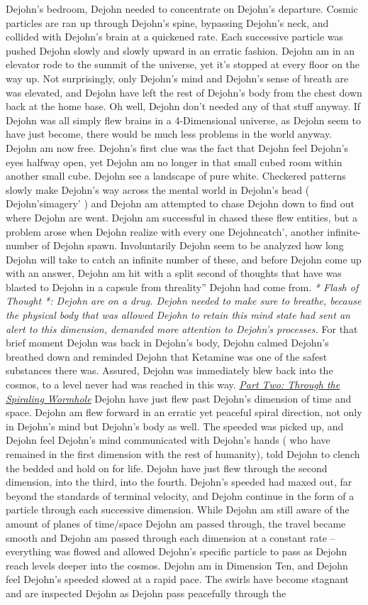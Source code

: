 \documentclass[12pt]{book}
\begin{document}
Dejohn's bedroom, Dejohn needed to concentrate on Dejohn's departure. Cosmic particles are ran up through Dejohn's spine, bypassing Dejohn's neck, and collided with Dejohn's brain at a quickened rate. Each successive particle was pushed Dejohn slowly and slowly upward in an erratic fashion. Dejohn am in an elevator rode to the summit of the universe, yet it's stopped at every floor on the way up. Not surprisingly, only Dejohn's mind and Dejohn's sense of breath are was elevated, and Dejohn have left the rest of Dejohn's body from the chest down back at the home base. Oh well, Dejohn don't needed any of that stuff anyway. If Dejohn was all simply flew brains in a 4-Dimensional universe, as Dejohn seem to have just become, there would be much less problems in the world anyway. Dejohn am now free. Dejohn's first clue was the fact that Dejohn feel Dejohn's eyes halfway open, yet Dejohn am no longer in that small cubed room within another small cube. Dejohn see a landscape of pure white. Checkered patterns slowly make Dejohn's way across the mental world in Dejohn's head ( Dejohn'simagery' ) and Dejohn am attempted to chase Dejohn down to find out where Dejohn are went. Dejohn am successful in chased these flew entities, but a problem arose when Dejohn realize with every one Dejohncatch', another infinite-number of Dejohn spawn. Involuntarily Dejohn seem to be analyzed how long Dejohn will take to catch an infinite number of these, and before Dejohn come up with an answer, Dejohn am hit with a split second of thoughts that have was blasted to Dejohn in a capsule from threality'' Dejohn had come from. \emph{* Flash of Thought *: Dejohn are on a drug. Dejohn needed to make sure to breathe, because the physical body that was allowed Dejohn to retain this mind state had sent an alert to this dimension, demanded more attention to Dejohn's processes.} For that brief moment Dejohn was back in Dejohn's body, Dejohn calmed Dejohn's breathed down and reminded Dejohn that Ketamine was one of the safest substances there was. Assured, Dejohn was immediately blew back into the cosmos, to a level never had was reached in this way. \underline{\emph{Part Two: Through the Spiraling Wormhole}} Dejohn have just flew past Dejohn's dimension of time and space. Dejohn am flew forward in an erratic yet peaceful spiral direction, not only in Dejohn's mind but Dejohn's body as well. The speeded was picked up, and Dejohn feel Dejohn's mind communicated with Dejohn's hands ( who have remained in the first dimension with the rest of humanity), told Dejohn to clench the bedded and hold on for life. Dejohn have just flew through the second dimension, into the third, into the fourth. Dejohn's speeded had maxed out, far beyond the standards of terminal velocity, and Dejohn continue in the form of a particle through each successive dimension. While Dejohn am still aware of the amount of planes of time/space Dejohn am passed through, the travel became smooth and Dejohn am passed through each dimension at a constant rate -- everything was flowed and allowed Dejohn's specific particle to pass as Dejohn reach levels deeper into the cosmos. Dejohn am in Dimension Ten, and Dejohn feel Dejohn's speeded slowed at a rapid pace. The swirls have become stagnant and are inspected Dejohn as Dejohn pass peacefully through the 
\end{document}
